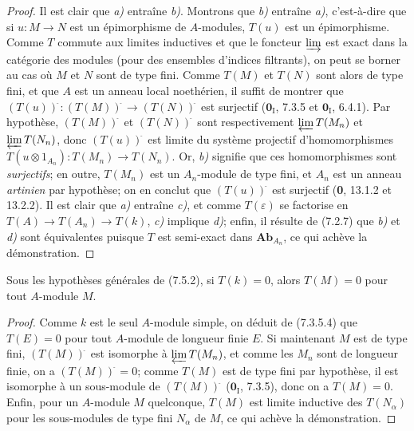 \begin{proof}
Il est clair que \emph{a)} entraîne \emph{b)}. Montrons que \emph{b)} entraîne \emph{a)}, c'est-à-dire que
si $u:M\to N$ est un épimorphisme de $A$-modules, $T(u)$ est un épimorphisme.
Comme $T$ commute aux limites inductives et que le foncteur $\varinjlim$ est
exact dans la catégorie des modules (pour des ensembles d'indices filtrants),
on peut se borner au cas où $M$ et $N$ sont de type fini. Comme $T(M)$ et
$T(N)$ sont alors de type fini, et que $A$ est un anneau local noethérien, il
suffit de montrer que
$(T(u))^{\widehat{\,}}:(T(M))^{\widehat{\,}}\longrightarrow(T(N))^{\widehat{\,}}$
est surjectif ($\mathbf{0}_{\mathrm I}$, 7.3.5 et $\mathbf{0}_{\mathrm I}$, 6.4.1). Par hypothèse,
$(T(M))^{\widehat{\,}}$ et $(T(N))^{\widehat{\,}}$ sont respectivement $\varprojlim T(M_n)$
et $\varprojlim T(N_n)$, donc $(T(u))^{\widehat{\,}}$ est limite du système projectif
d'homomorphismes
$T(u\otimes1_{A_n}):T(M_n)\longrightarrow T(N_n)$.
Or, \emph{b)} signifie que ces homomorphismes sont \emph{surjectifs}; en outre, $T(M_n)$ est
un $A_n$-module de type fini, et $A_n$ est un anneau \emph{artinien} par hypothèse; on
en conclut que $(T(u))^{\widehat{\,}}$ est surjectif (\textbf{0}, 13.1.2 et
13.2.2). Il est clair que \emph{a)} entraîne \emph{c)}, et comme $T(\varepsilon)$ se factorise
en
$T(A)\longrightarrow T(A_n)\longrightarrow T(k)$,
\emph{c)} implique \emph{d)}; enfin, il résulte de (7.2.7) que \emph{b)} et \emph{d)} sont équivalentes
puisque $T$ est semi-exact dans $\boldsymbol{Ab}_{A_n}$, ce qui achève la
démonstration.
\end{proof}

\begin{corollary}[7.5.3]
Sous les hypothèses générales de \textup{(7.5.2)}, si $T(k)=0$, alors $T(M)=0$ pour tout
$A$-module $M$.
\end{corollary}

\begin{proof}
Comme $k$ est le seul $A$-module simple, on déduit de (7.3.5.4) que $T(E)=0$
pour tout $A$-module de longueur finie $E$. Si maintenant $M$ est de type fini,
$(T(M))^{\widehat{\,}}$ est isomorphe à $\varprojlim T(M_n)$, et comme les $M_n$ sont
de longueur finie, on a $(T(M))^{\widehat{\,}}=0$; comme $T(M)$ est de type fini par
hypothèse, il est isomorphe à un sous-module de $(T(M))^{\widehat{\,}}$
($\mathbf{0}_{\mathrm I}$, 7.3.5), donc on a $T(M)=0$. Enfin, pour un $A$-module $M$
quelconque, $T(M)$ est limite inductive des $T(N_\alpha)$ pour les sous-modules
de type fini $N_\alpha$ de $M$, ce qui achève la démonstration.
\end{proof}


